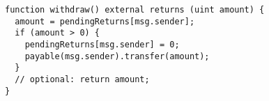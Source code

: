 \begin{lstlisting}[language=Solidity]
function withdraw() external returns (uint amount) {
  amount = pendingReturns[msg.sender];
  if (amount > 0) {
    pendingReturns[msg.sender] = 0;
	payable(msg.sender).transfer(amount);
  }
  // optional: return amount;
}

\end{lstlisting}